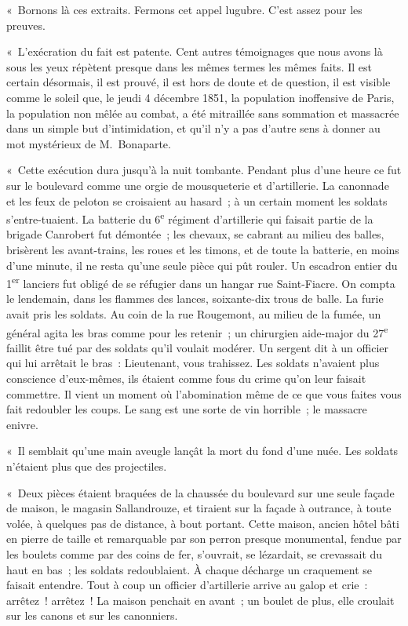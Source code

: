 \documentclass[french,twoside]{book} %
\begin{document}
\noindent « Bornons là ces extraits. Fermons cet appel lugubre. C’est assez pour les preuves.\par
« L’exécration du fait est patente. Cent autres témoignages que nous avons là sous les yeux répètent presque dans les mêmes termes les mêmes faits. Il est certain désormais, il est prouvé, il est hors de doute et de question, il est visible comme le soleil que, le jeudi 4 décembre 1851, la population inoffensive de Paris, la population non mêlée au combat, a été mitraillée sans sommation et massacrée dans un simple but d’intimidation, et qu’il n’y a pas d’autre sens à donner au mot mystérieux de M. Bonaparte.\par
« Cette exécution dura jusqu’à la nuit tombante. Pendant plus d’une heure ce fut sur le boulevard comme une orgie de mousqueterie et d’artillerie. La canonnade et les feux de peloton se croisaient au hasard ; à un certain moment les soldats s’entre-tuaient. La batterie du 6\textsuperscript{e} régiment d’artillerie qui faisait partie de la brigade Canrobert fut démontée ; les chevaux, se cabrant au milieu des balles, brisèrent les avant-trains, les roues et les timons, et de toute la batterie, en moins d’une minute, il ne resta qu’une seule pièce qui pût rouler. Un escadron entier du 1\textsuperscript{er} lanciers fut obligé de se réfugier dans un hangar rue Saint-Fiacre. On compta le lendemain, dans les flammes des lances, soixante-dix trous de balle. La furie avait pris les soldats. Au coin de la rue Rougemont, au milieu de la fumée, un général agita les bras comme pour les retenir ; un chirurgien aide-major du 27\textsuperscript{e} faillit être tué par des soldats qu’il voulait modérer. Un sergent dit à un officier qui lui arrêtait le bras : Lieutenant, vous trahissez. Les soldats n’avaient plus conscience d’eux-mêmes, ils étaient comme fous du crime qu’on leur faisait commettre. Il vient un moment où l’abomination même de ce que vous faites vous fait redoubler les coups. Le sang est une sorte de vin horrible ; le massacre enivre.\par
« Il semblait qu’une main aveugle lançât la mort du fond d’une nuée. Les soldats n’étaient plus que des projectiles.\par
« Deux pièces étaient braquées de la chaussée du boulevard sur une seule façade de maison, le magasin Sallandrouze, et tiraient sur la façade à outrance, à toute volée, à quelques pas de distance, à bout portant. Cette maison, ancien hôtel bâti en pierre de taille et remarquable par son perron presque monumental, fendue par les boulets comme par des coins de fer, s’ouvrait, se lézardait, se crevassait du haut en bas ; les soldats redoublaient. À chaque décharge un craquement se faisait entendre. Tout à coup un officier d’artillerie arrive au galop et crie : arrêtez ! arrêtez ! La maison penchait en avant ; un boulet de plus, elle croulait sur les canons et sur les canonniers.\par
\end{document}

